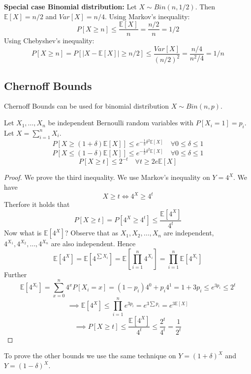 \begin{example}
    \textbf{Special case Binomial distribution: } Let $X \sim Bin(n, 1/2)$. Then $\mathbb{E}[X] = n/2$ and $Var[X] = n/4$.
    Using Markov's inequality:
    $$P[X \geq n] \leq \frac{\mathbb{E}[X]}{n} = \frac{n/2}{n} = 1/2$$
    Using Chebyshev's inequality:
    $$P[X \geq n] = P[|X-\mathbb{E}[X]| \geq n/2] \leq \frac{Var[X]}{(n/2)^2} = \frac{n/4}{n^2/4} = 1/n$$
\end{example}

\subsection{Chernoff Bounds}

\begin{remark}
    Chernoff Bounds can be used for binomial distribution $X \sim Bin(n, p)$.
\end{remark}

\begin{theorem}
    Let $X_1, \dots, X_n$ be independent Bernoulli random variables with $P[X_i=1] = p_i$. Let $X = \sum_{i=1}^n X_i$.
    $$P[X \geq (1+\delta)\mathbb{E}[X]] \leq e^{-\frac{1}{3}\delta^2\mathbb{E}[X]} \quad \forall 0 \leq \delta \leq 1$$
    $$P[X \leq (1-\delta)\mathbb{E}[X]] \leq e^{-\frac{1}{2}\delta^2\mathbb{E}[X]} \quad \forall 0 \leq \delta \leq 1$$
    $$P[X \geq t] \leq 2^{-t} \quad \forall t \geq 2 e \mathbb{E}[X]$$
\end{theorem}

\begin{proof}
    We prove the third inequality. We use Markov's inequality on $Y = 4^X$.
    We have 
    $$X \geq t \iff 4^X \geq 4^t$$
    Therfore it holds that
    $$P[X \geq t] = P[4^X \geq 4^t] \leq \frac{\mathbb{E}[4^X]}{4^t}$$
    Now what is $\mathbb{E}[4^X]$? Observe that as $X_1, X_2, \dots, X_n$ are independent, $4^{X_1}, 4^{X_2}, \dots, 4^{X_n}$ are also independent. Hence
    $$\mathbb{E}[4^X] = \mathbb{E}[4^{\sum X_i}] = \mathbb{E}[\prod_{i=1}^n 4^{X_i}] = \prod_{i=1}^n \mathbb{E}[4^{X_i}]$$
    Further
    $$\mathbb{E}[4^{X_i}] = \sum_{x=0}^n 4^x P[X_i=x] = (1-p_i) 4^0 + p_i 4^1 = 1 + 3p_i \leq e^{3p_i} \leq 2^t$$
    $$\implies \mathbb{E}[4^X] \leq \prod_{i=1}^n e^{3p_i} = e^{3\sum p_i} = e^{3\mathbb{E}[X]}$$
    $$\implies P[X \geq t] \leq \frac{\mathbb{E}[4^X]}{4^t} \leq \frac{2^t}{4^t} = \frac{1}{2^t}$$
\end{proof}

\begin{remark}
    To prove the other bounds we use the same technique on $Y = (1+\delta)^X$ and $Y = (1-\delta)^X$.
\end{remark}


